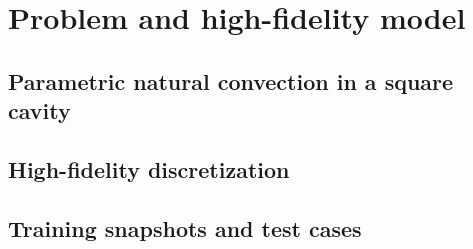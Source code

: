\section{Problem and high-fidelity model}
\label{sec:problem}

\subsection{Parametric natural convection in a square cavity}
\label{sec:cavity}

\subsection{High-fidelity discretization}
\label{sec:fom}

\subsection{Training snapshots and test cases}
\label{sec:cases}

